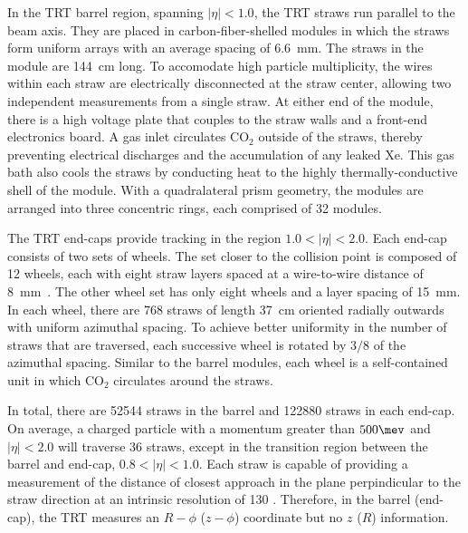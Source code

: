 In the TRT barrel region, spanning $|\eta| < 1.0$, the TRT straws run
parallel to the beam axis. They are placed in carbon-fiber-shelled modules
in which the straws form uniform arrays with an average spacing of
6.6~mm. The straws in the module are 144~cm long. To accomodate high
particle multiplicity, the wires within each straw are electrically
disconnected at the straw center, allowing two independent measurements
from a single straw. At either end of the module, there is a high
voltage plate that couples to the straw walls and a front-end
electronics board. A gas inlet circulates CO$_2$ outside of the
straws, thereby preventing electrical discharges and the accumulation
of any leaked Xe. This gas bath also cools the straws by conducting
heat to the highly thermally-conductive shell of the module. With a
quadralateral prism geometry, the modules are
arranged into three concentric rings, each comprised of 32 modules. 

The TRT end-caps provide tracking in the region $1.0 < |\eta| <
2.0$. Each end-cap consists of two sets of wheels. The set closer to
the collision point is composed of 12 wheels, each with eight straw
layers spaced at a wire-to-wire distance of
8~mm~\cite{bib:Abat:2008zz}. The other wheel set
has only eight wheels and a layer spacing of 15~mm. In each wheel,
there are 768 straws of length 37~cm oriented radially outwards with
uniform azimuthal spacing. To achieve better uniformity in the number
of straws that are traversed, each successive wheel is rotated by
$3/8$ of the azimuthal spacing. Similar to the barrel modules, each
wheel is a self-contained unit in which CO$_2$ circulates around the
straws. 

In total, there are 52544 straws in the barrel and 122880 straws in each
end-cap. On average, a charged particle with a momentum greater than
$500 \mev$ and $|\eta| < 2.0$ will traverse 36 straws, except in the
transition region between the barrel and end-cap, $0.8 < |\eta| <
1.0$. Each straw is capable of providing a measurement of the distance
of closest approach in the plane perpindicular to the straw direction
at an intrinsic resolution of 130 \micron. Therefore, in the barrel
(end-cap), the TRT measures an $R-\phi$ ($z-\phi$) coordinate but no $z$
($R$) information. 

